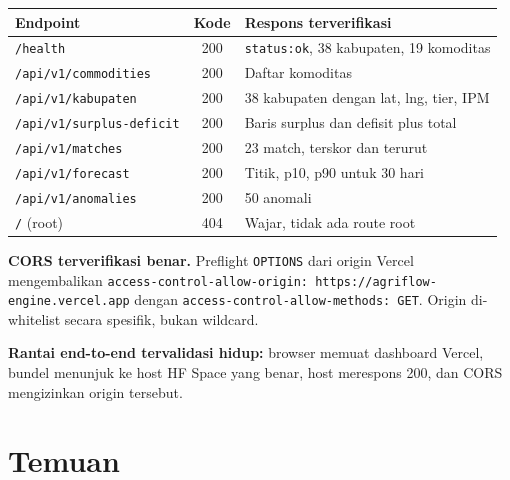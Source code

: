 \documentclass[11pt,a4paper]{article}
\newcommand{\code}[1]{\texttt{\small #1}}
\begin{document}
\begin{center}
\begin{tabular}{@{}p{6.4cm}cp{7.0cm}@{}}
\toprule
\textbf{Endpoint} & \textbf{Kode} & \textbf{Respons terverifikasi} \\
\midrule
\code{/health}                  & 200 & \code{status:ok}, 38 kabupaten, 19 komoditas \\
\code{/api/v1/commodities}      & 200 & Daftar komoditas \\
\code{/api/v1/kabupaten}        & 200 & 38 kabupaten dengan lat, lng, tier, IPM \\
\code{/api/v1/surplus-deficit}  & 200 & Baris surplus dan defisit plus total \\
\code{/api/v1/matches}          & 200 & 23 match, terskor dan terurut \\
\code{/api/v1/forecast}         & 200 & Titik, p10, p90 untuk 30 hari \\
\code{/api/v1/anomalies}        & 200 & 50 anomali \\
\code{/} (root)                 & 404 & Wajar, tidak ada route root \\
\bottomrule
\end{tabular}
\end{center}

\noindent
\textbf{CORS terverifikasi benar.} Preflight \code{OPTIONS} dari origin Vercel mengembalikan
\code{access-control-allow-origin: https://agriflow-engine.vercel.app} dengan
\code{access-control-allow-methods: GET}. Origin di-whitelist secara spesifik, bukan wildcard.

\noindent
\textbf{Rantai end-to-end tervalidasi hidup:} browser memuat dashboard Vercel, bundel menunjuk ke
host HF Space yang benar, host merespons 200, dan CORS mengizinkan origin tersebut.

\section{Temuan}
\end{document}
